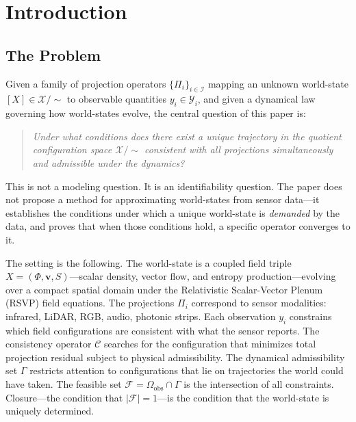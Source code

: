 \documentclass[12pt, oneside]{article}
\newcommand{\Xmod}{\mathcal{X}/{\sim}}
\begin{document}
\tableofcontents
\newpage

\section{Introduction}

\subsection{The Problem}

Given a family of projection operators $\{\Pi_i\}_{i \in \mathcal{I}}$ mapping an unknown
world-state $[X] \in \Xmod$ to observable quantities $y_i \in \mathcal{Y}_i$, and given a
dynamical law governing how world-states evolve, the central question of this paper is:

\begin{quote}
\textit{Under what conditions does there exist a unique trajectory in the quotient
configuration space $\Xmod$ consistent with all projections simultaneously and admissible
under the dynamics?}
\end{quote}

This is not a modeling question. It is an identifiability question. The paper does not
propose a method for approximating world-states from sensor data---it establishes the
conditions under which a unique world-state is \emph{demanded} by the data, and proves
that when those conditions hold, a specific operator converges to it.

The setting is the following. The world-state is a coupled field triple
$X = (\Phi, \mathbf{v}, S)$---scalar density, vector flow, and entropy
production---evolving over a compact spatial domain under the Relativistic Scalar-Vector
Plenum (RSVP) field equations. The projections $\Pi_i$ correspond to sensor modalities:
infrared, LiDAR, RGB, audio, photonic strips. Each observation $y_i$ constrains which
field configurations are consistent with what the sensor reports. The consistency operator
$\mathcal{C}$ searches for the configuration that minimizes total projection residual
subject to physical admissibility. The dynamical admissibility set $\Gamma$ restricts
attention to configurations that lie on trajectories the world could have taken. The
feasible set $\mathcal{F} = \Omega_{\mathrm{obs}} \cap \Gamma$ is the intersection of all
constraints. Closure---the condition that $|\mathcal{F}| = 1$---is the condition that the
world-state is uniquely determined.
\end{document}
